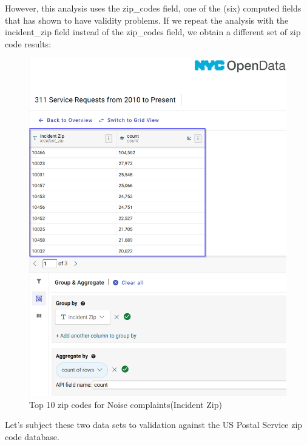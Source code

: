 \documentclass[12pt, titlepage]{article}
\begin{document}
		However, this analysis uses the zip\_codes field, one of the (six) computed fields that has shown to have validity problems. If we repeat the analysis with the 
		incident\_zip field instead of the zip\_codes field, we obtain a different set of zip code results:
		
		\begin{figure}[H]
	    		\centering
	    		\includegraphics[scale = 0.6]{incident_zip_casestudy.png}
	    		\caption{Top 10 zip codes for Noise complaints(Incident Zip)}
	    	\label{fig:casestudy1-incident-zip}
		\end{figure}
		
	Let's subject these two data sets to validation against the US Postal Service zip code database.
	 
\end{document}
